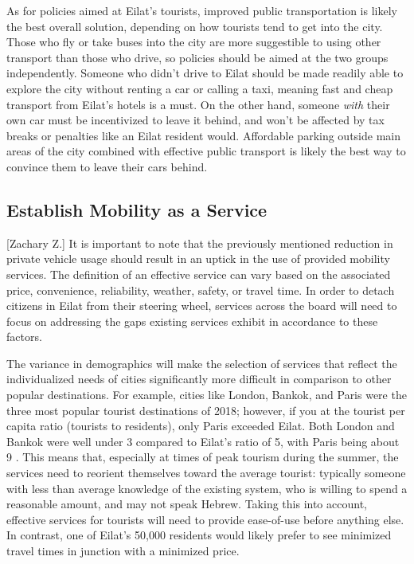 \documentclass[12pt]{article}                               %
\begin{document}
As for policies aimed at Eilat's tourists, improved public transportation is likely the best overall solution, depending on how tourists tend to get into the city. Those who fly or take buses into the city are more suggestible to using other transport than those who drive, so policies should be aimed at the two groups independently. Someone who didn't drive to Eilat should be made readily able to explore the city without renting a car or calling a taxi, meaning fast and cheap transport from Eilat's hotels is a must. On the other hand, someone \textit{with} their own car must be incentivized to leave it behind, and won't be affected by tax breaks or penalties like an Eilat resident would. Affordable parking outside main areas of the city combined with effective public transport is likely the best way to convince them to leave their cars behind.

\subsection{Establish Mobility as a Service}[Zachary Z.]    
It is important to note that the previously mentioned reduction in private vehicle usage should result in an uptick in the use of provided mobility services. The definition of an effective service can vary based on the associated price, convenience, reliability, weather, safety, or travel time. In order to detach citizens in Eilat from their steering wheel, services across the board will need to focus on addressing the gaps existing services exhibit in accordance to these factors. 

The variance in demographics will make the selection of services that reflect the individualized needs of cities significantly more difficult in comparison to other popular destinations. For example, cities like London, Bankok, and Paris were the three most popular tourist destinations of 2018; however, if you at the tourist per capita ratio (tourists to residents), only Paris exceeded Eilat. Both London and Bankok were well under 3 compared to Eilat's ratio of 5, with Paris being about 9 \cite{Murray2018MostInsider}. This means that, especially at times of peak tourism during the summer, the services need to reorient themselves toward the average tourist: typically someone with less than average knowledge of the existing system, who is willing to spend a reasonable amount, and may not speak Hebrew. Taking this into account, effective services for tourists will need to provide ease-of-use before anything else. In contrast, one of Eilat's 50,000 residents would likely prefer to see minimized travel times in junction with a minimized price. 
\end{document}
